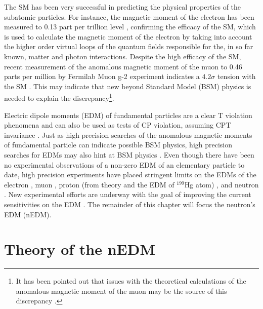 The SM has been very successful in predicting the physical properties of the subatomic particles. For instance, the magnetic moment of the electron has been measured to 0.13 part per trillion level \cite{Fan2023}, confirming the efficacy of the SM, which is used to calculate the magnetic moment of the electron by taking into account the higher order virtual loops of the quantum fields responsible for the, in so far known, matter and photon interactions. Despite the high efficacy of the SM, recent measurement of the anomalous magnetic moment of the muon to 0.46 parts per million by Fermilab Muon g-2 experiment \cite{Abi2021} indicates a $4.2\sigma$ tension with the SM \cite{Aoyama2020}. This may indicate that new beyond Standard Model (BSM) physics is needed to explain the discrepancy\footnote{It has been pointed out that issues with the theoretical calculations of the anomalous magnetic moment of the muon may be the source of this discrepancy \cite{Borsanyi2021}.}.

Electric dipole moments (EDM) of fundamental particles are a clear T violation phenomena and can also be used as tests of CP violation, assuming CPT invariance \cite{Khriplovich1997, Chupp2019}. Just as high precision searches of the anomalous magnetic moments of fundamental particle can indicate possible BSM physics, high precision searches for EDMs may also hint at BSM physics \cite{Pospelov2005, Ginges2004, Chupp2019, Engel2013}. Even though there have been no experimental observations of a non-zero EDM of an elementary particle to date, high precision experiments have placed stringent limits on the EDMs of the electron \cite{Roussy2023}, muon \cite{Bennett2009}, proton (from theory and the EDM of $^{199}$Hg atom) \cite{Sahoo2017}, and neutron \cite{Abel2020}. New experimental efforts are underway with the goal of improving the current sensitivities on the EDM \cite{Chupp2019}. The remainder of this chapter will focus the neutron's EDM (nEDM). 


\section{Theory of the nEDM}

